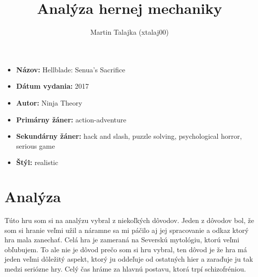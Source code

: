 \documentclass[a4paper,10pt,english]{article}
\title{%
Analýza hernej mechaniky%
}
\author{%
Martin Talajka (xtalaj00)%
}
\date{}
\begin{document}
\maketitle
\thispagestyle{empty}

{%
\large

\begin{itemize}

\item[] \textbf{Názov:} Hellblade: Senua's Sacrifice

\item[] \textbf{Dátum vydania:} 2017

\item[] \textbf{Autor:} Ninja Theory

\item[] \textbf{Primárny žáner:} action-adventure

\item[] \textbf{Sekundárny žáner:} hack and slash, puzzle solving, psychological horror, serious game

\item[] \textbf{Štýl:} realistic

\end{itemize}

}

\section*{\centering Analýza}

Túto hru som si na analýzu vybral z niekoľkých dôvodov. Jeden z dôvodov bol, že som si hranie veľmi užil a náramne sa mi páčilo aj jej spracovanie a odkaz ktorý hra mala zanechať. Celá hra je zameraná na Severskú mytológiu, ktorú veľmi obľubujem. To ale nie je dôvod prečo som si hru vybral, ten dôvod je že hra má jeden veľmi dôležitý aspekt, ktorý ju oddeľuje od ostatných hier a zaraďuje ju tak medzi seriózne hry. Celý čas hráme za hlavnú postavu, ktorá trpí schizofréniou. 
\end{document}
